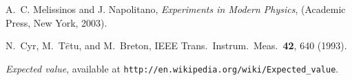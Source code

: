 \documentclass[letterpaper,12pt]{article}
\begin{document}

\begin{thebibliography}{99}

A.~C. Melissinos and J. Napolitano, \textit{Experiments in Modern Physics},
(Academic Press, New York, 2003).

N.\ Cyr, M.\ T$\hat{e}$tu, and M.\ Breton,
IEEE Trans.\ Instrum.\ Meas.\ \textbf{42}, 640 (1993).

 \emph{Expected value},  available at
\texttt{http://en.wikipedia.org/wiki/Expected\_value}.

\end{thebibliography}
\end{document}
